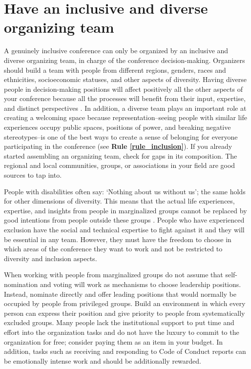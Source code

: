 \documentclass[10pt,letterpaper]{article}
\begin{document}
\section{Have an inclusive and diverse organizing team}
\label{rule_organizing_team}


A genuinely inclusive conference can only be organized by an inclusive and diverse organizing team, in charge of the conference decision-making.
Organizers should build a team with people from different regions, genders, races and ethnicities, socioeconomic statuses, and other aspects of diversity.
Having diverse people in decision-making positions will affect positively all the other aspects of your conference because all the processes will benefit from their input, expertise, and distinct perspectives \cite{hongGroupsDiverseProblem2004}. 
In addition, a diverse team plays an important role at creating a welcoming space because representation--seeing people with similar life experiences occupy public spaces, positions of power, and breaking negative stereotypes--is one of the best ways to create a sense of belonging for everyone participating in the conference (see \textbf{Rule \ref{rule_inclusion}}). If you already started assembling an organizing team, check for gaps in its composition. 
The regional and local communities, groups, or associations in your field are good sources to tap into. 

People with disabilities often say: `Nothing about us without us'; the same holds for other dimensions of diversity. This means that the actual life experiences, expertise, and insights from people in marginalized groups cannot be replaced by good intentions from people outside these groups \cite{costanzachockDesign2020}.
People who have experienced exclusion have the social and technical expertise to fight against it and they will be essential in any team.
However, they must have the freedom to choose in which areas of the conference they want to work and not be restricted to diversity and inclusion aspects. 

When working with people from marginalized groups do not assume that self-nomination and voting will work as mechanisms to choose leadership positions. Instead, nominate directly and offer leading positions that would normally be occupied by people from privileged groups.
Build an environment in which every person can express their position and give priority to people from systematically excluded groups.
Many people lack the institutional support to put time and effort into the organization tasks and do not have the luxury to commit to the organization for free; consider paying them as an item in your budget.  
In addition, tasks such as receiving and responding to Code of Conduct reports can be emotionally intense work and should be additionally rewarded.
\end{document}
